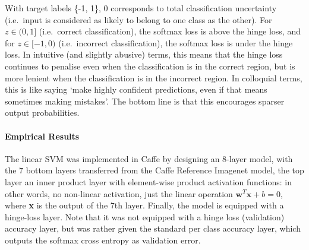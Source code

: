 \documentclass[a4paper,11pt]{article}
\begin{document}
With target labels \{-1, 1\}, 0 corresponds to total classification uncertainty (i.e.\ input is considered as likely to belong to one class as the other). For $z \in (0,1]$ (i.e.\ correct classification), the softmax loss is above the hinge loss, and for $z \in [-1,0)$ (i.e.\ incorrect classification), the softmax loss is under the hinge loss. In intuitive (and slightly abusive) terms, this means that the hinge loss continues to penalise even when the classification is in the correct region, but is more lenient when the classification is in the incorrect region. In colloquial terms, this is like saying `make highly confident predictions, even if that means sometimes making mistakes'. The bottom line is that this encourages sparser output probabilities.

\paragraph{Empirical Results}

The linear SVM was implemented in Caffe by designing an 8-layer model, with the 7 bottom layers transferred from the Caffe Reference Imagenet model, the top layer an inner product layer with element-wise product activation functions: in other words, no non-linear activation, just the linear operation $\textbf{w}^T \textbf{x} + b = 0$, where \textbf{x} is the output of the 7th layer. Finally, the model is equipped with a hinge-loss layer. Note that it was not equipped with a hinge loss (validation) accuracy layer, but was rather given the standard per class accuracy layer, which outputs the softmax cross entropy as validation error. \\
\end{document}
